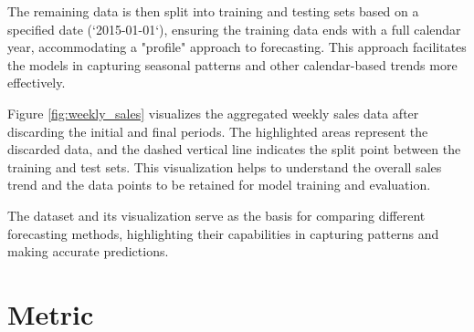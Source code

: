 The remaining data is then split into training and testing sets based on a specified date (`2015-01-01`), ensuring the training data ends with a full calendar year, accommodating a "profile" approach to forecasting. This approach facilitates the models in capturing seasonal patterns and other calendar-based trends more effectively.

Figure \ref{fig:weekly_sales} visualizes the aggregated weekly sales data after discarding the initial and final periods. The highlighted areas represent the discarded data, and the dashed vertical line indicates the split point between the training and test sets. This visualization helps to understand the overall sales trend and the data points to be retained for model training and evaluation.

The dataset and its visualization serve as the basis for comparing different forecasting methods, highlighting their capabilities in capturing patterns and making accurate predictions.

\section{Metric}